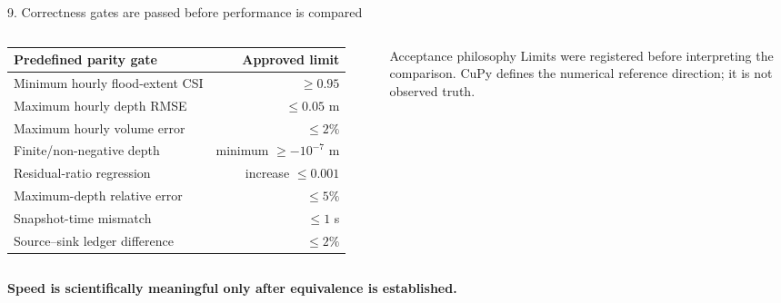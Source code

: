 \documentclass[aspectratio=169,10pt]{beamer}
\begin{document}
\begin{frame}{9. Correctness gates are passed before performance is compared}
\begin{columns}[T,onlytextwidth]
\scriptsize
\begin{tabularx}{\textwidth}{@{}Xr@{}}
\toprule
\textbf{Predefined parity gate} & \textbf{Approved limit}\\
\midrule
Minimum hourly flood-extent CSI & $\geq0.95$\\
Maximum hourly depth RMSE & $\leq0.05$ m\\
Maximum hourly volume error & $\leq2\%$\\
Finite/non-negative depth & minimum $\geq-10^{-7}$ m\\
Residual-ratio regression & increase $\leq0.001$\\
Maximum-depth relative error & $\leq5\%$\\
Snapshot-time mismatch & $\leq1$ s\\
Source--sink ledger difference & $\leq2\%$\\
\bottomrule
\end{tabularx}
\begin{block}{Acceptance philosophy}
\small
Limits were registered before interpreting the comparison. CuPy defines the numerical
reference direction; it is not observed truth.
\end{block}
\centering
{}
\end{columns}

\centering\color{hfblue}\normalsize\bfseries Speed is scientifically meaningful only after equivalence is established.
\end{frame}
\end{document}
